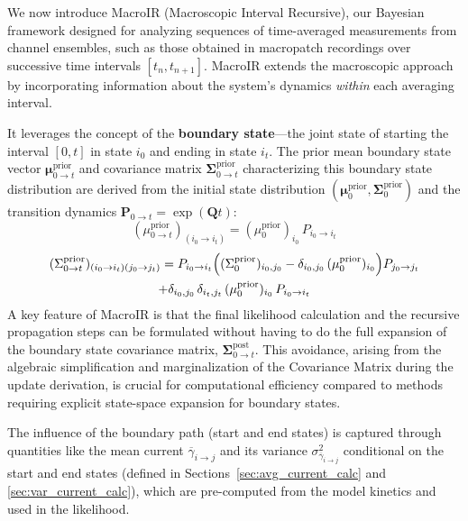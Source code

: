 \documentclass[pdflatex,sn-nature]{sn-jnl}%
\begin{document}
We now introduce MacroIR (Macroscopic Interval Recursive), our Bayesian framework designed for analyzing sequences of time-averaged measurements from channel ensembles, such as those obtained in macropatch recordings over successive time intervals \([t_n, t_{n+1}]\). MacroIR extends the macroscopic approach by incorporating information about the system's dynamics \textit{within} each averaging interval. 

It leverages the concept of the \textbf{boundary state}—the joint state of starting the interval \([0, t]\) in state \(i_0\) and ending in state \(i_t\). The prior mean boundary state vector \(\boldsymbol{\mu}^{\text{prior}}_{0 \rightarrow t}\) and covariance matrix \(\boldsymbol{\Sigma}^{\text{prior}}_{0 \rightarrow t}\) characterizing this boundary state distribution are derived from the initial state distribution \((\boldsymbol{\mu}^{\text{prior}}_0, \boldsymbol{\Sigma}^{\text{prior}}_0)\) and the transition dynamics \(\mathbf{P}_{0 \rightarrow t} = \exp(\boldsymbol{Q}t)\):
\begin{equation}
	(\mu^{\text{prior}}_{0 \rightarrow t})_{(i_0 \rightarrow i_t)} = (\mu^{\text{prior}}_0)_{i_0} \, P_{i_0 \rightarrow i_t}
	\label{eq:boundary_mean_prior}
\end{equation}
\begin{multline}
	(\Sigma^{\text{prior}}_{0 \rightarrow t})_{(i_0 \rightarrow i_t)(j_0 \rightarrow j_t)} = P_{i_0 \rightarrow i_t}\Bigl((\Sigma^{\text{prior}}_0)_{i_0,j_0} - \delta_{i_0,j_0}\, (\mu^{\text{prior}}_0)_{i_0}\Bigr) P_{j_0 \rightarrow j_t} \\
	+ \delta_{i_0,j_0}\,\delta_{i_t,j_t}\, (\mu^{\text{prior}}_0)_{i_0}\, P_{i_0 \rightarrow i_t}
	\label{eq:boundary_covariance_prior}
\end{multline}
A key feature of MacroIR is that the final likelihood calculation and the recursive propagation steps can be formulated without having to do the full expansion of the boundary state covariance matrix, \(\boldsymbol{\Sigma}^{\text{post}}_{0 \rightarrow t}\). This avoidance, arising from the algebraic simplification and marginalization of the Covariance Matrix during the update derivation, is crucial for computational efficiency compared to methods requiring explicit state-space expansion for boundary states.

The influence of the boundary path (start and end states) is captured through quantities like the mean current \(\overline{\gamma}_{i \rightarrow j}\) and its variance \(\sigma^2_{\overline{\gamma}_{i \rightarrow j}}\) conditional on the start and end states (defined in Sections~\ref{sec:avg_current_calc} and \ref{sec:var_current_calc}), which are pre-computed from the model kinetics and used in the likelihood.
\end{document}
